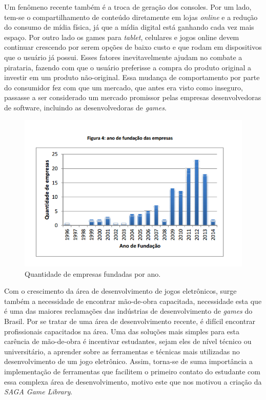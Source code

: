 Um fenômeno recente também é a troca de geração dos consoles. Por um lado, tem-se o compartilhamento de conteúdo diretamente em lojas \textit{online} e a redução do consumo de mídia física, já que a mídia digital está ganhando cada vez mais espaço. Por outro lado os games para \textit{tablet}, celulares e jogos online devem continuar crescendo por serem opções de baixo custo e que rodam em dispositivos que o usuário já possui. Esses fatores inevitavelmente ajudam no combate a pirataria, fazendo com que o usuário preferisse a compra do produto original a investir em um produto não-original. Essa mudança de comportamento por parte do consumidor fez com que um mercado, que antes era visto como inseguro, passasse a ser considerado um mercado promissor pelas empresas desenvolvedoras de software, incluindo as desenvolvedoras de \textit{games}.
%
%
%
\begin{figure}[h]
    \centering
    \includegraphics[scale = 0.80]{Imagens/AnoFundacaoEmpresas.png}
    \caption{Quantidade de empresas fundadas por ano.\cite{GEDIGames}}
    \label{AnoFundacaoEmpresas}
\end{figure}
%
%
%
\par
Com o crescimento da área de desenvolvimento de jogos eletrônicos, surge também a necessidade de encontrar mão-de-obra capacitada, necessidade esta que é uma das maiores reclamações das indústrias de desenvolvimento de \textit{games} do Brasil. Por se tratar de uma área de desenvolvimento recente, é difícil encontrar profissionais capacitados na área. Uma das soluções mais simples para esta carência de mão-de-obra é incentivar estudantes, sejam eles de nível técnico ou universitário, a aprender sobre as ferramentas e técnicas mais utilizadas no desenvolvimento de um jogo eletrônico. Assim, torna-se de suma importância a implementação de ferramentas que facilitem o primeiro contato do estudante com essa complexa área de desenvolvimento, motivo este que nos motivou a criação da \textit{SAGA Game Library}.
%
%
